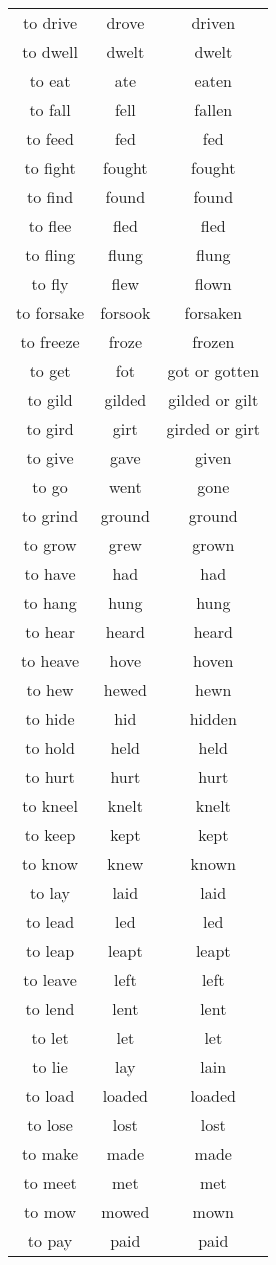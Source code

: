 \documentclass[a4paper, titlepage]{article}
\begin{document}
\begin{tabular}{ccc}
to drive&drove&driven\\
to dwell&dwelt&dwelt\\
to eat&ate&eaten\\
to fall&fell&fallen\\
to feed&fed&fed\\
to fight&fought&fought\\
to find&found&found\\
to flee&fled&fled\\
to fling&flung&flung\\
to fly&flew&flown\\
to forsake&forsook&forsaken\\
to freeze&froze&frozen\\
to get&fot&got or gotten\\
to gild&gilded&gilded or gilt\\
to gird&girt&girded or girt\\
to give&gave&given\\
to go&went&gone\\
to grind&ground&ground\\
to grow&grew&grown\\
to have&had&had\\
to hang&hung&hung\\
to hear&heard&heard\\
to heave&hove&hoven\\
to hew&hewed&hewn\\
to hide&hid&hidden\\
to hold&held&held\\
to hurt&hurt&hurt\\
to kneel&knelt&knelt\\
to keep&kept&kept\\
to know&knew&known\\
to lay&laid&laid\\
to lead&led&led\\
to leap&leapt&leapt\\
to leave&left&left\\
to lend&lent&lent\\
to let&let&let\\
to lie&lay&lain\\
to load&loaded&loaded\\
to lose&lost&lost\\
to make&made&made\\
to meet&met&met\\
to mow&mowed&mown\\
to pay&paid&paid\\

\end{tabular}
\end{document}
